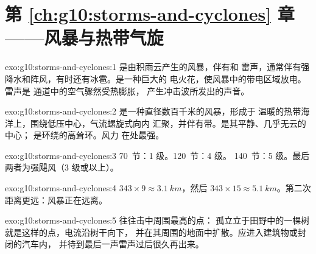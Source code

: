 \section*{第 \ref{ch:g10:storms-and-cyclones} 章——风暴与热带气旋}

\begin{solution}{exo:g10:storms-and-cyclones:1}
是由积雨云产生的风暴，伴有和
雷声，通常伴有强降水和阵风，有时还有冰雹。是一种巨大的
电火花，使风暴中的带电区域放电。雷声是
通道中的空气骤然受热膨胀，
产生冲击波所发出的声音。
\end{solution}

\begin{solution}{exo:g10:storms-and-cyclones:2}
是一种直径数百千米的风暴，形成于
温暖的热带海洋上，围绕低压中心，气流螺旋式向内
汇聚，并伴有带。是其平静、几乎无云的中心；
是环绕的高耸环。风力
在处最强。
\end{solution}

\begin{solution}{exo:g10:storms-and-cyclones:3}
\num{70}~节：1 级。\num{120}~节：4 级。
\num{140}~节：5 级。最后两者为强飓风（3
级或以上）。
\end{solution}

\begin{solution}{exo:g10:storms-and-cyclones:4}
$343 \times 9 \approx \qty{3.1}{km}$，然后 $343 \times 15 \approx
\qty{5.1}{km}$。第二次距离更远：风暴正在远离。
\end{solution}

\begin{solution}{exo:g10:storms-and-cyclones:5}
往往击中周围最高的点：
孤立立于田野中的一棵树就是这样的点，电流沿树干向下，
并在其周围的地面中扩散。应进入建筑物或封闭的汽车内，
并待到最后一声雷声过后很久再出来。
\end{solution}

